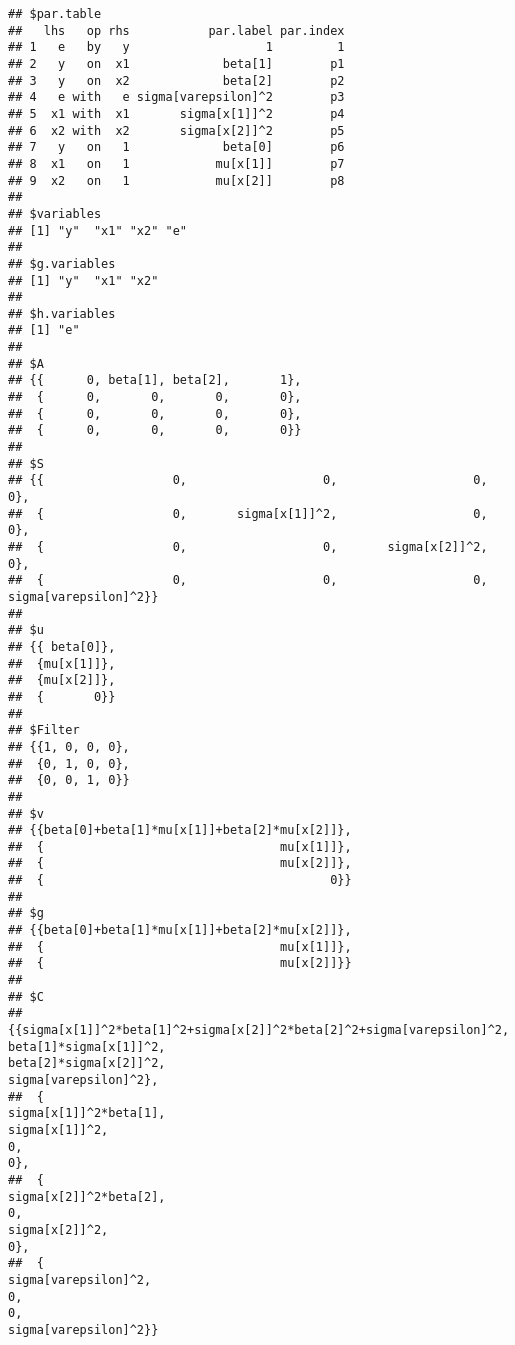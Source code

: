 \documentclass[
]{book}
\theoremstyle{definition}
\theoremstyle{definition}
\theoremstyle{definition}
\theoremstyle{remark}
\begin{document}
\begin{verbatim}
## $par.table
##   lhs   op rhs           par.label par.index
## 1   e   by   y                   1         1
## 2   y   on  x1             beta[1]        p1
## 3   y   on  x2             beta[2]        p2
## 4   e with   e sigma[varepsilon]^2        p3
## 5  x1 with  x1       sigma[x[1]]^2        p4
## 6  x2 with  x2       sigma[x[2]]^2        p5
## 7   y   on   1             beta[0]        p6
## 8  x1   on   1            mu[x[1]]        p7
## 9  x2   on   1            mu[x[2]]        p8
## 
## $variables
## [1] "y"  "x1" "x2" "e" 
## 
## $g.variables
## [1] "y"  "x1" "x2"
## 
## $h.variables
## [1] "e"
## 
## $A
## {{      0, beta[1], beta[2],       1},
##  {      0,       0,       0,       0},
##  {      0,       0,       0,       0},
##  {      0,       0,       0,       0}} 
## 
## $S
## {{                  0,                   0,                   0,                   0},
##  {                  0,       sigma[x[1]]^2,                   0,                   0},
##  {                  0,                   0,       sigma[x[2]]^2,                   0},
##  {                  0,                   0,                   0, sigma[varepsilon]^2}} 
## 
## $u
## {{ beta[0]},
##  {mu[x[1]]},
##  {mu[x[2]]},
##  {       0}} 
## 
## $Filter
## {{1, 0, 0, 0},
##  {0, 1, 0, 0},
##  {0, 0, 1, 0}} 
## 
## $v
## {{beta[0]+beta[1]*mu[x[1]]+beta[2]*mu[x[2]]},
##  {                                 mu[x[1]]},
##  {                                 mu[x[2]]},
##  {                                        0}} 
## 
## $g
## {{beta[0]+beta[1]*mu[x[1]]+beta[2]*mu[x[2]]},
##  {                                 mu[x[1]]},
##  {                                 mu[x[2]]}} 
## 
## $C
## {{sigma[x[1]]^2*beta[1]^2+sigma[x[2]]^2*beta[2]^2+sigma[varepsilon]^2,                                               beta[1]*sigma[x[1]]^2,                                               beta[2]*sigma[x[2]]^2,                                                 sigma[varepsilon]^2},
##  {                                              sigma[x[1]]^2*beta[1],                                                       sigma[x[1]]^2,                                                                   0,                                                                   0},
##  {                                              sigma[x[2]]^2*beta[2],                                                                   0,                                                       sigma[x[2]]^2,                                                                   0},
##  {                                                sigma[varepsilon]^2,                                                                   0,                                                                   0,                                                 sigma[varepsilon]^2}} 

\end{verbatim}
\end{document}
